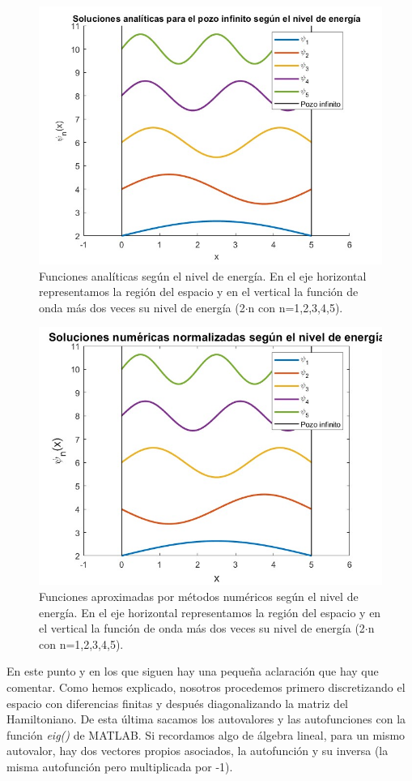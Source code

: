 \documentclass[12pt]{article}
\begin{document}
     \begin{figure}[H]
         \centering
         \includegraphics[width=0.9\linewidth]{fotos/infinito_analiticas.jpg}
         \caption{Funciones analíticas según el nivel de energía. En el eje horizontal representamos la región del espacio y en el vertical la función de onda más dos veces su nivel de energía (2$\cdot$n con n=1,2,3,4,5).}
     \end{figure}

     \begin{figure}[H]
         \centering
         \includegraphics[width=0.9\linewidth]{fotos/infinito_numericas.jpg}
         \caption{Funciones aproximadas por métodos numéricos según el nivel de energía. En el eje horizontal representamos la región del espacio y en el vertical la función de onda más dos veces su nivel de energía (2$\cdot$n con n=1,2,3,4,5).}
     \end{figure}
     \vspace{5mm}
En este punto y en los que siguen hay una pequeña aclaración que hay que comentar. Como hemos explicado, nosotros procedemos primero discretizando el espacio con diferencias finitas y después diagonalizando la matriz del Hamiltoniano. De esta última sacamos los autovalores y las autofunciones con la función \textit{eig()} de MATLAB. Si recordamos algo de álgebra lineal, para un mismo autovalor, hay dos vectores propios asociados, la autofunción y su inversa (la misma autofunción pero multiplicada por -1).\\
\end{document}
